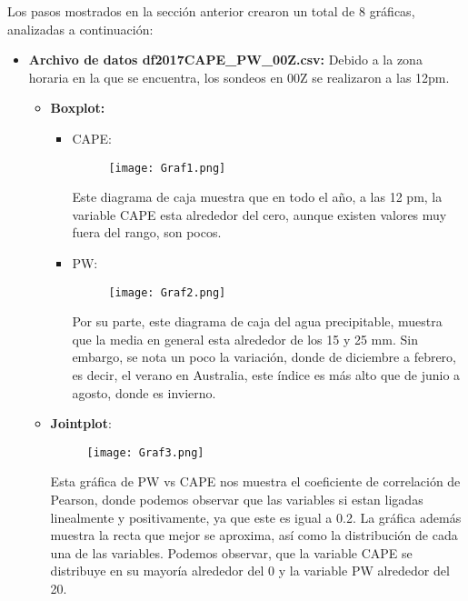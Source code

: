 \documentclass[a4paper]{article}
\begin{document}
Los pasos mostrados en la sección anterior crearon un total de 8 gráficas, analizadas a continuación: 

\begin{itemize}
\item \textbf{Archivo de datos df2017CAPE\_PW\_00Z.csv: }
Debido a la zona horaria en la que se encuentra, los sondeos en 00Z se realizaron a las 12pm. 
\begin{itemize}
\item \textbf{Boxplot:} \\
\begin{itemize}
\item CAPE: 
\begin{figure}[h!]
  \texttt{[image: Graf1.png]}
  \centering
  \label{fig:G1}
\end{figure}

Este diagrama de caja muestra que en todo el año, a las 12 pm, la variable CAPE esta alrededor del cero, aunque existen valores muy fuera del rango, son pocos.\\

\item PW: \\
\begin{figure}[h!]
  \texttt{[image: Graf2.png]}
  \centering
  \label{fig:G2}
\end{figure}

Por su parte, este diagrama de caja del agua precipitable, muestra que la media en general esta alrededor de los 15 y 25 mm. Sin embargo, se nota un poco la variación, donde de diciembre a febrero, es decir, el verano en Australia, este índice es más alto que de junio a agosto, donde es invierno. 
\end{itemize}

\clearpage

\item \textbf{Jointplot}:\\
\begin{figure}[h!]
  \texttt{[image: Graf3.png]}
  \centering
  \label{fig:G3}
\end{figure}

Esta gráfica de PW vs CAPE nos muestra el coeficiente de correlación de Pearson, donde podemos observar que las variables si estan ligadas linealmente y positivamente, ya que este es igual a 0.2. La gráfica además muestra la recta que mejor se aproxima, así como la distribución de cada una de las variables. Podemos observar, que la variable CAPE se distribuye en su mayoría alrededor del 0 y la variable PW alrededor del 20.\\


\end{itemize}
\end{itemize}
\end{document}
